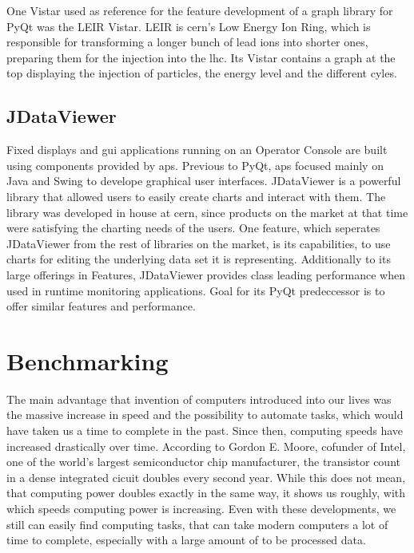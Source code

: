 One Vistar used as reference for the feature development of a graph library for
PyQt was the LEIR Vistar. LEIR is \gls{cern}'s Low Energy Ion Ring, which is
responsible for transforming a longer bunch of lead ions into shorter ones,
preparing them for the injection into the \gls{lhc}. Its Vistar contains a graph
at the top displaying the injection of particles, the energy level and the
different cyles.

\cite{Leir}





\subsection{JDataViewer}
\label{sec:fundamentals:cerncharting:jdataviewer}

Fixed displays and \gls{gui} applications running on an Operator Console are
built using components provided by \gls{aps}. Previous to PyQt, \gls{aps}
focused mainly on Java and Swing to develope graphical user interfaces.
JDataViewer is a powerful library that allowed users to easily create charts and
interact with them. The library was developed in house at \gls{cern}, since
products on the market at that time were satisfying the charting needs of the
users. One feature, which seperates JDataViewer from the rest of libraries on
the market, is its capabilities, to use charts for editing the underlying data
set it is representing. Additionally to its large offerings in Features,
JDataViewer provides class leading performance when used in runtime monitoring
applications. Goal for its PyQt predeccessor is to offer similar features and
performance.

\cite{JDataViewer}



\section{Benchmarking}
\label{sec:fundamentals:benchmarking}

The main advantage that invention of computers introduced into our lives was the
massive increase in speed and the possibility to automate tasks, which would
have taken us a time to complete in the past. Since then, computing speeds have
increased drastically over time. According to Gordon E. Moore, cofunder of
Intel, one of the world's largest semiconductor chip manufacturer, the
transistor count in a dense integrated cicuit doubles every second year. While
this does not mean, that computing power doubles exactly in the same way, it
shows us roughly, with which speeds computing power is increasing. Even with
these developments, we still can easily find computing tasks, that can take
modern computers a lot of time to complete, especially with a large amount of to
be processed data.

